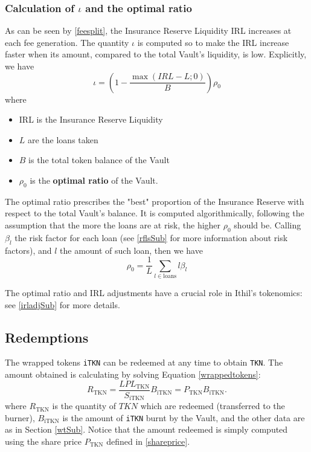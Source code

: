 \documentclass[a4paper,10 pt]{article}
\theoremstyle{definition}
\begin{document}
\subsubsection{Calculation of $\iota$ and the optimal ratio}\label{iotaSubSub}

As can be seen by \eqref{feesplit}, the Insurance Reserve Liquidity IRL increases at each fee generation. The quantity $\iota$ is computed so to make the IRL increase faster when its amount, compared to the total Vault's liquidity, is low. Explicitly, we have
\begin{equation}\label{iota}
\iota = \left(1-\frac{\max(IRL-L;0)}{B}\right)\rho_0
\end{equation}
where 
\begin{itemize}
\item IRL is the Insurance Reserve Liquidity
\item $L$ are the loans taken
\item $B$ is the total token balance of the Vault
\item $\rho_0$ is the {\bf optimal ratio} of the Vault.
\end{itemize}

The optimal ratio prescribes the "best" proportion of the Insurance Reserve with respect to the total Vault's balance. It is computed algorithmically, following the assumption that the more the loans are at risk, the higher $\rho_0$ should be. Calling $\beta_l$ the risk factor for each loan (see \ref{rflsSub} for more information about risk factors), and $l$ the amount of such loan, then we have
\begin{equation}\label{optimalratio}
\rho_0 = \frac{1}{L}\sum_{l \in \text{loans}}l \beta_l
\end{equation}

The optimal ratio and IRL adjustments have a crucial role in Ithil's tokenomics: see \ref{irladjSub} for more details.

\subsection{Redemptions}\label{redSub}

The wrapped tokens \verb|iTKN| can be redeemed at any time to obtain \verb|TKN|. The amount obtained is calculating by solving Equation \eqref{wrappedtokens}:
\begin{equation}\label{redemptions}
R_{\text{TKN}} = \frac{LPL_{\text{TKN}}}{S_{\text{iTKN}}}B_{\text{iTKN}} = P_{\text{TKN}} B_{\text{iTKN}}.
\end{equation}
where $R_{\text{TKN}}$ is the quantity of $TKN$ which are redeemed (transferred to the burner), $B_{\text{iTKN}}$ is the amount of \verb|iTKN| burnt by the Vault, and the other data are as in Section \ref{wtSub}. Notice that the amount redeemed is simply computed using the share price $P_{\text{TKN}}$ defined in \eqref{shareprice}.
\end{document}
